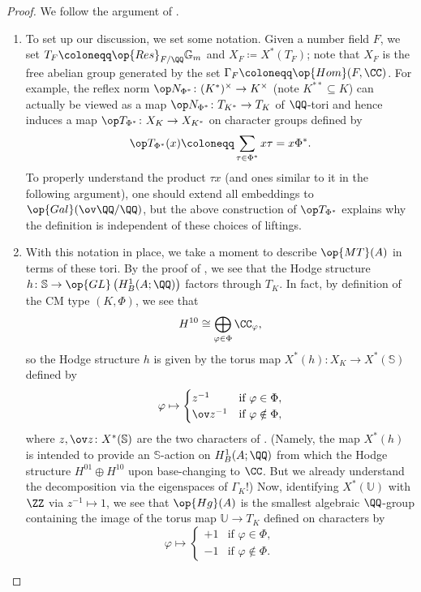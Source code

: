 \documentclass{article}
\begin{document}
\begin{proof}
	We follow the argument of \cite[Proposition~1.1]{yanai-degenerate-cm-type}.
	\begin{enumerate}
		\item To set up our discussion, we set some notation. Given a number field $F$, we set $T_F\coloneqq\op{Res}_{F/\QQ}\mathbb G_m$ and $X_F\coloneqq X^*(T_F)$; note that $X_F$ is the free abelian group generated by the set $\Gamma_F\coloneqq\op{Hom}(F,\CC)$. For example, the reflex norm $\op N_{\Phi^*}\colon (K^*)^\times\to K^\times$ (note $K^{**}\subseteq K$) can actually be viewed as a map $\op N_{\Phi^*}\colon T_{K^*}\to T_K$ of $\QQ$-tori and hence induces a map $\op T_{\Phi^*}\colon X_K\to X_{K^*}$ on character groups defined by
		\[\op T_{\Phi^*}(x)\coloneqq\sum_{\tau\in\Phi^*}x\tau=x\Phi^*.\]
		To properly understand the product $\tau x$ (and ones similar to it in the following argument), one should extend all embeddings to $\op{Gal}(\ov\QQ/\QQ)$, but the above construction of $\op T_{\Phi^*}$ explains why the definition is independent of these choices of liftings.

		\item With this notation in place, we take a moment to describe $\op{MT}(A)$ in terms of these tori. By the proof of , we see that the Hodge structure $h\colon\mathbb S\to\op{GL}\left(H^1_B(A;\QQ)\right)$ factors through $T_K$. In fact, by definition of the CM type $(K,\Phi)$, we see that
		\[H^{10}\cong\bigoplus_{\varphi\in\Phi}\CC_\varphi,\]
		so the Hodge structure $h$ is given by the torus map $X^*(h)\colon X_K\to X^*(\mathbb S)$ defined by
		\[\varphi\mapsto\begin{cases}
			z^{-1} & \text{if }\varphi\in\Phi, \\
			\ov z^{-1} & \text{if }\varphi\notin\Phi,
		\end{cases}\]
		where $z,\ov z\colon X^*(\mathbb S)$ are the two characters of . (Namely, the map $X^*(h)$ is intended to provide an $\mathbb S$-action on $H^1_B(A;\QQ)$ from which the Hodge structure $H^{01}\oplus H^{10}$ upon base-changing to $\CC$. But we already understand the decomposition via the eigenspaces of $\Gamma_K$!) Now, identifying $X^*(\mathbb U)$ with $\ZZ$ via $z^{-1}\mapsto1$, we see that $\op{Hg}(A)$ is the smallest algebraic $\QQ$-group containing the image of the torus map $\mathbb U\to T_K$ defined on characters by
		\[\varphi\mapsto\begin{cases}
			+1 & \text{if }\varphi\in\Phi, \\
			-1 & \text{if }\varphi\notin\Phi.
		\end{cases}\]


\end{enumerate}
\end{proof}
\end{document}
